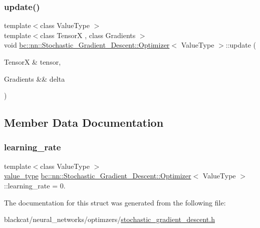 \mbox{\label{structbc_1_1nn_1_1Stochastic__Gradient__Descent_1_1Optimizer_a18dac0703a9fddc5b9edc9f616061fc0}} 
\subsubsection{\texorpdfstring{update()}{update()}}
{\footnotesize\ttfamily template$<$class Value\+Type $>$ \\
template$<$class TensorX , class Gradients $>$ \\
void \hyperlink{structbc_1_1nn_1_1Stochastic__Gradient__Descent_1_1Optimizer}{bc\+::nn\+::\+Stochastic\+\_\+\+Gradient\+\_\+\+Descent\+::\+Optimizer}$<$ Value\+Type $>$\+::update (\begin{DoxyParamCaption}\item[{TensorX \&}]{tensor,  }\item[{Gradients \&\&}]{delta }\end{DoxyParamCaption})\hspace{0.3cm}{\ttfamily [inline]}}



\subsection{Member Data Documentation}
\mbox{\label{structbc_1_1nn_1_1Stochastic__Gradient__Descent_1_1Optimizer_a63def0690fc6f712ac037d9354023983}} 
\subsubsection{\texorpdfstring{learning\+\_\+rate}{learning\_rate}}
{\footnotesize\ttfamily template$<$class Value\+Type $>$ \\
\hyperlink{structbc_1_1nn_1_1Stochastic__Gradient__Descent_1_1Optimizer_a255321a50ffae76f028227a998915bc6}{value\+\_\+type} \hyperlink{structbc_1_1nn_1_1Stochastic__Gradient__Descent_1_1Optimizer}{bc\+::nn\+::\+Stochastic\+\_\+\+Gradient\+\_\+\+Descent\+::\+Optimizer}$<$ Value\+Type $>$\+::learning\+\_\+rate = 0.}



The documentation for this struct was generated from the following file\+:\begin{DoxyCompactItemize}
\item 
blackcat/neural\+\_\+networks/optimzers/\hyperlink{stochastic__gradient__descent_8h}{stochastic\+\_\+gradient\+\_\+descent.\+h}\end{DoxyCompactItemize}
